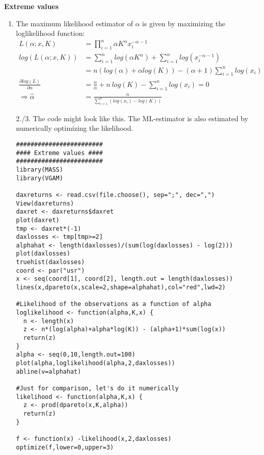 \begin{Solution}{12.1}
\textbf{Extreme values}

\begin{enumerate}
\item The maximum likelihood estimator of $\alpha$ is given by maximizing
    the loglikelihood function:
\begin{align*}
  L(\alpha;x,K) &= \prod_{i=1}^n \alpha K^\alpha x_i^{-\alpha-1}\\
  log(L(\alpha;x,K))&= \sum_{i=1}^n log(\alpha K^\alpha) + \sum_{i=1}^n log(x_i^{-\alpha-1})\\
    & = n(log(\alpha)+ \alpha log(K)) - (\alpha+1) \sum_{i=1}^n log(x_i)\\
  \frac{\partial log(L)}{\partial \alpha} &= \frac{n}{\alpha} + n ~ log(K) - \sum_{i=1}^n log(x_i) = 0\\
  \Rightarrow \hat{\alpha} &= \frac{n}{\sum_{i=1}^n (log(x_i)-log(K))}
\end{align*}
\item[2./3.] The code might look like this. The ML-estimator is also estimated by numerically optimizing the likelihood.
\begin{verbatim}
########################
#### Extreme values ####
########################
library(MASS)
library(VGAM)

daxreturns <- read.csv(file.choose(), sep=";", dec=",")
View(daxreturns)
daxret <- daxreturns$daxret
plot(daxret)
tmp <- daxret*(-1)
daxlosses <- tmp[tmp>=2]
alphahat <- length(daxlosses)/(sum(log(daxlosses) - log(2)))
plot(daxlosses)
truehist(daxlosses)
coord <- par("usr")
x <- seq(coord[1], coord[2], length.out = length(daxlosses))
lines(x,dpareto(x,scale=2,shape=alphahat),col="red",lwd=2)

#Likelihood of the observations as a function of alpha
loglikelihood <- function(alpha,K,x) {
  n <- length(x)
  z <- n*(log(alpha)+alpha*log(K)) - (alpha+1)*sum(log(x))
  return(z)
}
alpha <- seq(0,10,length.out=100)
plot(alpha,loglikelihood(alpha,2,daxlosses))
abline(v=alphahat)

#Just for comparison, let's do it numerically
likelihood <- function(alpha,K,x) {
  z <- prod(dpareto(x,K,alpha))
  return(z)
}

f <- function(x) -likelihood(x,2,daxlosses)
optimize(f,lower=0,upper=3)
\end{verbatim}
\end{enumerate}
\end{Solution}
